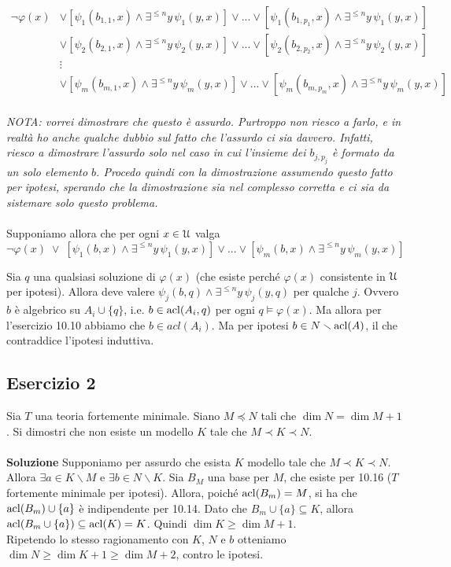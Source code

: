 \documentclass[10pt,a4paper]{article}
\def\phi{\varphi}
\def\U{\EuScript U}
\def\E{\exists}
\def\acl{{\rm acl}}
\def\models{\vDash}
\def\sm{\smallsetminus}
\begin{document}
\begin{equation*}
\begin{split}
\neg \phi(x)& 	\vee [\psi_1(b_{1,1},x) \wedge \E^{\le n}y\,\psi_1(y,x)] \vee ... \vee [\psi_1(b_{1,p_1},x) \wedge \E^{\le n}y\,\psi_1(y,x)] \\
			&	\vee [\psi_2(b_{2,1},x) \wedge \E^{\le n}y\,\psi_2(y,x)] \vee ... \vee [\psi_2(b_{2,p_2},x) \wedge \E^{\le n}y\,\psi_2(y,x)] \\
			&	\vdots \\
			&	\vee [\psi_m(b_{m,1},x) \wedge \E^{\le n}y\,\psi_m(y,x)] \vee ... \vee [\psi_m(b_{m,p_m},x) \wedge \E^{\le n}y\,\psi_m(y,x)] \\
\end{split}
\end{equation*}

\noindent \emph{NOTA: vorrei dimostrare che questo è assurdo. Purtroppo non riesco a farlo, e in realtà ho anche qualche dubbio sul fatto che l'assurdo ci sia davvero. Infatti, riesco a dimostrare l'assurdo solo nel caso in cui l'insieme dei $b_{j,p_j}$ è formato da un solo elemento $b$. Procedo quindi con la dimostrazione assumendo questo fatto per ipotesi, sperando che la dimostrazione sia nel complesso corretta e ci sia da sistemare solo questo problema.}\\
\\
Supponiamo allora che per ogni $x \in \U$ valga
$$\neg \phi(x) \; \vee \; [\psi_1(b,x) \wedge \E^{\le n}y\,\psi_1(y,x)] \vee ... \vee [\psi_m(b,x) \wedge \E^{\le n}y\,\psi_m(y,x)]$$

Sia $q$ una qualsiasi soluzione di $\phi(x)$ (che esiste perché $\phi(x)$ consistente in $\U$ per ipotesi). Allora deve valere $\psi_j(b,q) \wedge \E^{\le n}y\,\psi_j(y,q)$ per qualche $j$. Ovvero $b$ è algebrico su $A_i \cup \{q\}$, i.e. $b \in \acl(A_i,q)$ per ogni $q \models \phi(x)$. Ma allora per l'esercizio 10.10 abbiamo che $b \in acl(A_i)$. Ma per ipotesi $b \in N \sm \acl(A)$, il che contraddice l'ipotesi induttiva.

\subsection*{Esercizio 2}

Sia $T$ una teoria fortemente minimale. Siano $M\preceq N$ tali che $\dim N=\dim M+1$. Si dimostri che non esiste un modello $K$ tale che $M\prec K\prec N$.\\
\\
\noindent\textbf{Soluzione} Supponiamo per assurdo che esista $K$ modello tale che $M\prec K\prec N$. Allora $\exists a \in K \sm M$ e $\exists b \in N \sm K$. Sia $B_M$ una base per $M$, che esiste per 10.16 ($T$ fortemente minimale per ipotesi). Allora, poiché $\acl(B_m) = M$, si ha che $\acl(B_m) \cup \{a\}$ è indipendente per 10.14. Dato che $B_m \cup \{a\} \subseteq K$, allora $\acl(B_m \cup \{a\}) \subseteq \acl(K)=K$. Quindi $\dim K \geq \dim M +1$.\\
Ripetendo lo stesso ragionamento con $K$, $N$ e $b$ otteniamo $\dim N \geq \dim K +1 \geq \dim M +2$, contro le ipotesi.
\end{document}
